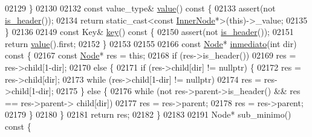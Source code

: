 \begin{DoxyCode}
02129         \}
02130 
02132         \textcolor{keyword}{const} value\_type& \hyperlink{structaed2_1_1map_1_1Node_af4ada8e79dabb4849fc87de63d3970fb_af4ada8e79dabb4849fc87de63d3970fb}{value}()\textcolor{keyword}{ const }\{
02133             assert(not \hyperlink{structaed2_1_1map_1_1Node_ae6cc4598a60dbab7120ffae58ebbadca_ae6cc4598a60dbab7120ffae58ebbadca}{is_header}());
02134             \textcolor{keywordflow}{return} \textcolor{keyword}{static\_cast<}\textcolor{keyword}{const }\hyperlink{structaed2_1_1map_1_1InnerNode}{InnerNode}*\textcolor{keyword}{>}(\textcolor{keyword}{this})->\_value;
02135         \}
02136 
02149         \textcolor{keyword}{const} Key& \hyperlink{structaed2_1_1map_1_1Node_a5451f8da0b7ad3582fab1decad5d09cb_a5451f8da0b7ad3582fab1decad5d09cb}{key}()\textcolor{keyword}{ const }\{
02150             assert(not \hyperlink{structaed2_1_1map_1_1Node_ae6cc4598a60dbab7120ffae58ebbadca_ae6cc4598a60dbab7120ffae58ebbadca}{is_header}());
02151             \textcolor{keywordflow}{return} \hyperlink{structaed2_1_1map_1_1Node_af4ada8e79dabb4849fc87de63d3970fb_af4ada8e79dabb4849fc87de63d3970fb}{value}().first;
02152         \}
02153 
02155 
02166         \textcolor{keyword}{const} \hyperlink{structaed2_1_1map_1_1Node_a9c1a600491066ce7eb669b1cb76d56c6_a9c1a600491066ce7eb669b1cb76d56c6}{Node}* \hyperlink{structaed2_1_1map_1_1Node_a4d5263c74ea5f78025fea331267730ce_a4d5263c74ea5f78025fea331267730ce}{inmediato}(\textcolor{keywordtype}{int} dir)\textcolor{keyword}{ const }\{
02167             \textcolor{keyword}{const} \hyperlink{structaed2_1_1map_1_1Node_a9c1a600491066ce7eb669b1cb76d56c6_a9c1a600491066ce7eb669b1cb76d56c6}{Node}* res = \textcolor{keyword}{this};
02168             \textcolor{keywordflow}{if} (res->is\_header())
02169                 res = res->child[1-dir];
02170             \textcolor{keywordflow}{else} \{
02171                 if (res->child[dir] != \textcolor{keyword}{nullptr}) \{
02172                     res = res->child[dir];
02173                     \textcolor{keywordflow}{while} (res->child[1-dir] != \textcolor{keyword}{nullptr})
02174                         res = res->child[1-dir];
02175                 \} \textcolor{keywordflow}{else} \{
02176                     \textcolor{keywordflow}{while} (not res->parent->is\_header() && res == res->parent->
      child[dir])
02177                         res = res->parent;
02178                     res = res->parent;
02179                 \}
02180             \}
02181             \textcolor{keywordflow}{return} res;
02182         \}
02183 
02191         Node* sub\_minimo()\textcolor{keyword}{ const }\{

\end{DoxyCode}
